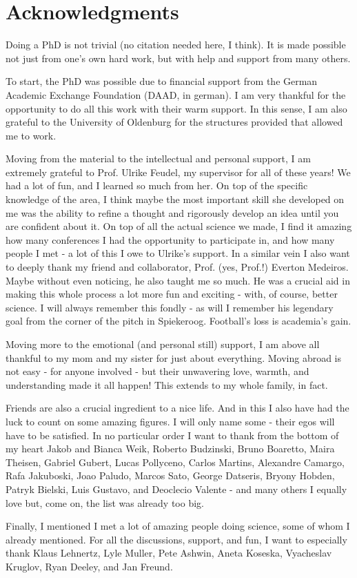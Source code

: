 \chapter*{Acknowledgments}
Doing a PhD is not trivial (no citation needed here, I think). It is made possible not just from one's own hard work, but with help and support from many others. 

To start, the PhD was possible due to financial support from the German Academic Exchange Foundation (DAAD, in german). I am very thankful for the opportunity to do all this work with their warm support. In this sense, I am also grateful to the University of Oldenburg for the structures provided that allowed me to work. 

Moving from the material to the intellectual and personal support, I am extremely grateful to Prof. Ulrike Feudel, my supervisor for all of these years! We had a lot of fun, and I learned so much from her. On top of the specific knowledge of the area, I think maybe the most important skill she developed on me was the ability to refine a thought and rigorously develop an idea until you are confident about it. On top of all the actual science we made, I find it amazing how many conferences I had the opportunity to participate in, and how many people I met - a lot of this I owe to Ulrike's support. In a similar vein I also want to deeply thank my friend and collaborator, Prof. (yes, Prof.!) Everton Medeiros. Maybe without even noticing, he also taught me so much. He was a crucial aid in making this whole process a lot more fun and exciting - with, of course, better science. I will always remember this fondly - as will I remember his legendary goal from the corner of the pitch in Spiekeroog. Football's loss is academia's gain.       

Moving more to the emotional (and personal still) support, I am above all thankful to my mom and my sister for just about everything. Moving abroad is not easy - for anyone involved - but their unwavering love, warmth, and understanding made it all happen! This extends to my whole family, in fact. 

Friends are also a crucial ingredient to a nice life. And in this I also have had the luck to count on some amazing figures. I will only name some - their egos will have to be satisfied. In no particular order I want to thank from the bottom of my heart Jakob and Bianca Weik, Roberto Budzinski, Bruno Boaretto, Maira Theisen, Gabriel Gubert, Lucas Pollyceno, Carlos Martins, Alexandre Camargo, Rafa Jakuboski, Joao Paludo, Marcos Sato, George Datseris, Bryony Hobden, Patryk Bielski, Luis Gustavo, and Deoclecio Valente - and many others I equally love but, come on, the list was already too big. 

Finally, I mentioned I met a lot of amazing people doing science, some of whom I already mentioned. For all the discussions, support, and fun, I want to especially thank Klaus Lehnertz, Lyle Muller, Pete Ashwin, Aneta Koseska, Vyacheslav Kruglov, Ryan Deeley, and Jan Freund.